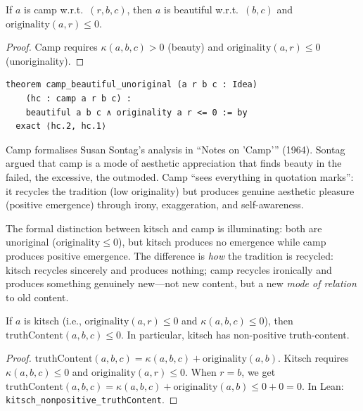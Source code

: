 \begin{theorem}
\label{thm:camp-beautiful-unoriginal}
If $a$ is camp w.r.t.\ $(r, b, c)$, then $a$ is beautiful w.r.t.\ $(b, c)$
and $\mathrm{originality}(a, r) \leq 0$.
\end{theorem}

\begin{proof}
Camp requires $\kappa(a, b, c) > 0$ (beauty) and
$\mathrm{originality}(a, r) \leq 0$ (unoriginality).
\end{proof}

\begin{lstlisting}
theorem camp_beautiful_unoriginal (a r b c : Idea)
    (hc : camp a r b c) :
    beautiful a b c ∧ originality a r <= 0 := by
  exact ⟨hc.2, hc.1⟩
\end{lstlisting}

\begin{interpretation}
\label{int:camp-sontag}
Camp formalises Susan Sontag's analysis in ``Notes on 'Camp'{}'' (1964).
Sontag argued that camp is a mode of aesthetic appreciation that finds
beauty in the failed, the excessive, the outmoded.  Camp ``sees everything
in quotation marks'': it recycles the tradition (low originality) but
produces genuine aesthetic pleasure (positive emergence) through irony,
exaggeration, and self-awareness.

The formal distinction between kitsch and camp is illuminating: both are
unoriginal ($\mathrm{originality} \leq 0$), but kitsch produces no
emergence while camp produces positive emergence.  The difference is
\emph{how} the tradition is recycled: kitsch recycles sincerely and produces
nothing; camp recycles ironically and produces something genuinely new---not
new content, but a new \emph{mode of relation} to old content.
\end{interpretation}

\begin{theorem}
\label{thm:kitsch-zero-originality}
If $a$ is kitsch (i.e., $\mathrm{originality}(a, r) \leq 0$ and $\kappa(a, b, c) \leq 0$), then $\mathrm{truthContent}(a, b, c) \leq 0$.  In particular, kitsch has non-positive truth-content.
\end{theorem}

\begin{proof}
$\mathrm{truthContent}(a, b, c) = \kappa(a, b, c) + \mathrm{originality}(a, b)$.  Kitsch requires $\kappa(a, b, c) \leq 0$ and $\mathrm{originality}(a, r) \leq 0$.  When $r = b$, we get $\mathrm{truthContent}(a, b, c) = \kappa(a, b, c) + \mathrm{originality}(a, b) \leq 0 + 0 = 0$.  In Lean: \texttt{kitsch\_nonpositive\_truthContent}.
\end{proof}

